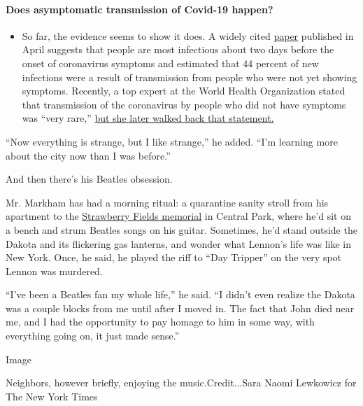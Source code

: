 \begin{itemize}
{  \paragraph{Does asymptomatic transmission of Covid-19
  happen?}\label{does-asymptomatic-transmission-of-covid-19-happen}}

  \begin{itemize}
  \tightlist
  \item
    So far, the evidence seems to show it does. A widely cited
    \href{https://www.nature.com/articles/s41591-020-0869-5}{paper}
    published in April suggests that people are most infectious about
    two days before the onset of coronavirus symptoms and estimated that
    44 percent of new infections were a result of transmission from
    people who were not yet showing symptoms. Recently, a top expert at
    the World Health Organization stated that transmission of the
    coronavirus by people who did not have symptoms was ``very rare,''
    \href{https://www.nytimes.com/2020/06/09/world/coronavirus-updates.html?action=click\&pgtype=Article\&state=default\&region=MAIN_CONTENT_3\&context=storylines_faq\#link-1f302e21}{but
    she later walked back that statement.}
  \end{itemize}
\end{itemize}

``Now everything is strange, but I like strange,'' he added. ``I'm
learning more about the city now than I was before.''

And then there's his Beatles obsession.

Mr. Markham has had a morning ritual: a quarantine sanity stroll from
his apartment to the
\href{https://www.centralparknyc.org/attractions/strawberry-fields}{Strawberry
Fields memorial} in Central Park, where he'd sit on a bench and strum
Beatles songs on his guitar. Sometimes, he'd stand outside the Dakota
and its flickering gas lanterns, and wonder what Lennon's life was like
in New York. Once, he said, he played the riff to ``Day Tripper'' on the
very spot Lennon was murdered.

``I've been a Beatles fan my whole life,'' he said. ``I didn't even
realize the Dakota was a couple blocks from me until after I moved in.
The fact that John died near me, and I had the opportunity to pay homage
to him in some way, with everything going on, it just made sense.''

Image

Neighbors, however briefly, enjoying the music.Credit...Sara Naomi
Lewkowicz for The New York Times

